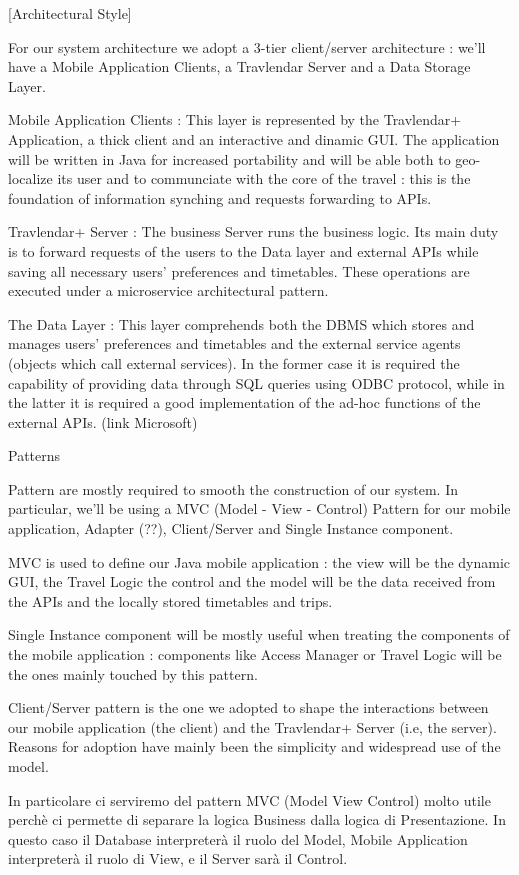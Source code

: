 
[Architectural Style]

For our system architecture we adopt a 3-tier client/server architecture : we'll have a Mobile Application Clients, a Travlendar
 Server and a Data Storage Layer.


Mobile Application Clients : This layer is represented by the Travlendar+ Application, a thick client and an interactive and dinamic GUI.
The application will be written in Java for increased portability and will be able both to geo-localize its user and to communciate with the core of the travel : this is the foundation of information synching and requests forwarding to APIs.

Travlendar+ Server : The business Server runs the business logic. Its main duty is to forward requests of the users to the Data layer and external APIs while saving all necessary users' preferences and timetables. These operations are executed under a microservice architectural pattern.

The Data Layer : This layer comprehends both the DBMS which stores and manages users' preferences and timetables and the external service agents (objects which call external services). In the former case it is required the capability of providing data through SQL queries using ODBC protocol, while in the latter it is required a good implementation of the ad-hoc functions of the external APIs.
(link Microsoft)

Patterns

Pattern are mostly required to smooth the construction of our system. In particular, we'll be using a MVC (Model - View - Control) Pattern for our mobile application, Adapter (??), Client/Server and Single Instance component.

MVC is used to define our Java mobile application : the view will be the dynamic GUI, the Travel Logic the control and the model will be the data received from the APIs and the locally stored timetables and trips.


Single Instance component will be mostly useful when treating the components of the mobile application : components like Access Manager or Travel Logic will be the ones mainly touched by this pattern.

Client/Server pattern is the one we adopted to shape the interactions between our mobile application (the client) and the Travlendar+ Server (i.e, the server). Reasons for adoption have mainly been the simplicity and widespread use of the model.


In particolare ci serviremo del pattern MVC (Model View Control) molto utile perchè ci permette di separare la logica Business dalla logica di Presentazione. In questo caso il Database interpreterà il ruolo del Model, Mobile Application interpreterà il ruolo di View, e il Server sarà il Control. 
